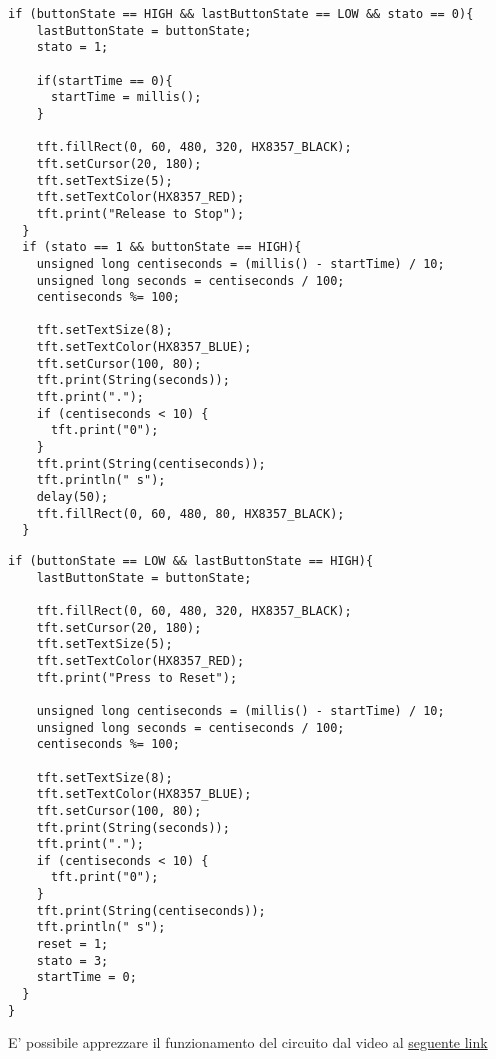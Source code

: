 \begin{lstlisting}[frame=single, language=Arduino]
  if (buttonState == HIGH && lastButtonState == LOW && stato == 0){
    lastButtonState = buttonState;
    stato = 1;
    
    if(startTime == 0){
      startTime = millis();
    }
    
    tft.fillRect(0, 60, 480, 320, HX8357_BLACK);
    tft.setCursor(20, 180);
    tft.setTextSize(5);
    tft.setTextColor(HX8357_RED);
    tft.print("Release to Stop");
  }
  if (stato == 1 && buttonState == HIGH){
    unsigned long centiseconds = (millis() - startTime) / 10;
    unsigned long seconds = centiseconds / 100;
    centiseconds %= 100;

    tft.setTextSize(8);
    tft.setTextColor(HX8357_BLUE);
    tft.setCursor(100, 80);
    tft.print(String(seconds));
    tft.print(".");
    if (centiseconds < 10) {
      tft.print("0");
    }
    tft.print(String(centiseconds));
    tft.println(" s");
    delay(50);
    tft.fillRect(0, 60, 480, 80, HX8357_BLACK);
  }
\end{lstlisting}
\clearpage
\begin{lstlisting}[frame=single, language=Arduino]
  if (buttonState == LOW && lastButtonState == HIGH){
    lastButtonState = buttonState;

    tft.fillRect(0, 60, 480, 320, HX8357_BLACK);
    tft.setCursor(20, 180);
    tft.setTextSize(5);
    tft.setTextColor(HX8357_RED);
    tft.print("Press to Reset");

    unsigned long centiseconds = (millis() - startTime) / 10;
    unsigned long seconds = centiseconds / 100;
    centiseconds %= 100;

    tft.setTextSize(8);
    tft.setTextColor(HX8357_BLUE);
    tft.setCursor(100, 80);
    tft.print(String(seconds));
    tft.print(".");
    if (centiseconds < 10) {
      tft.print("0");
    }
    tft.print(String(centiseconds));
    tft.println(" s");
    reset = 1;
    stato = 3;
    startTime = 0;
  }
}
\end{lstlisting}
E' possibile apprezzare il funzionamento del circuito dal video al \href{https://mediaspace.unipd.it/media/Esperimento+1/1_e1cn00nn}{seguente link} 